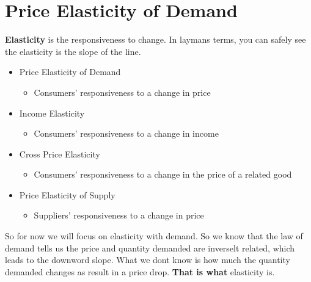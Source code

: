 \section{Price Elasticity of Demand}
\begin{definition}
    \textbf{Elasticity} is the responsiveness to change. In laymans terms, you can safely see the elasticity is the slope of the line.
\end{definition}
\begin{itemize}
    \item Price Elasticity of Demand
        \begin{itemize}
            \item Consumers' responsiveness to a change in price
        \end{itemize}
    \item Income Elasticity
        \begin{itemize}
            \item Consumers' responsiveness to a change in income
        \end{itemize}
    \item Cross Price Elasticity
        \begin{itemize}
            \item Consumers' responsiveness to a change in the price of a related good
        \end{itemize}
    \item Price Elasticity of Supply
        \begin{itemize}
            \item Suppliers' responsiveness to a change in price
        \end{itemize}
\end{itemize}

So for now we will focus on elasticity with demand. So we know that the law of demand tells us the price and quantity demanded are inverselt related, which leads to the downword slope. What we dont know is how much the quantity demanded changes as result in a price drop. \textbf{That is what} elasticity is. 

